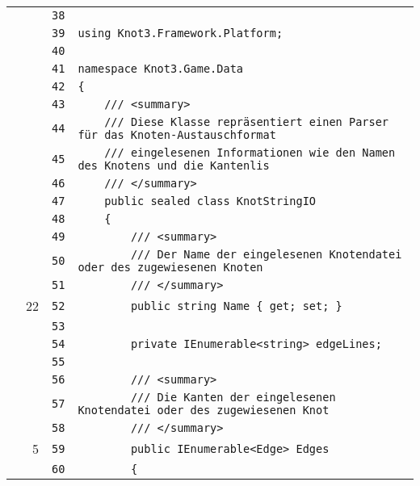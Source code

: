 \documentclass[a4paper,10pt]{article}
\begin{document}
\begin{longtable}[l]{lrrl}
\cellcolor{gray} &  & \verb~38~ & \verb~~\\
\cellcolor{gray} &  & \verb~39~ & \verb~using Knot3.Framework.Platform;~\\
\cellcolor{gray} &  & \verb~40~ & \verb~~\\
\cellcolor{gray} &  & \verb~41~ & \verb~namespace Knot3.Game.Data~\\
\cellcolor{gray} &  & \verb~42~ & \verb~{~\\
\cellcolor{gray} &  & \verb~43~ & \verb~    /// <summary>~\\
\cellcolor{gray} &  & \verb~44~ & \verb~    /// Diese Klasse repräsentiert einen Parser für das Knoten-Austauschformat~\\
\cellcolor{gray} &  & \verb~45~ & \verb~    /// eingelesenen Informationen wie den Namen des Knotens und die Kantenlis~\\
\cellcolor{gray} &  & \verb~46~ & \verb~    /// </summary>~\\
\cellcolor{gray} &  & \verb~47~ & \verb~    public sealed class KnotStringIO~\\
\cellcolor{gray} &  & \verb~48~ & \verb~    {~\\
\cellcolor{gray} &  & \verb~49~ & \verb~        /// <summary>~\\
\cellcolor{gray} &  & \verb~50~ & \verb~        /// Der Name der eingelesenen Knotendatei oder des zugewiesenen Knoten~\\
\cellcolor{gray} &  & \verb~51~ & \verb~        /// </summary>~\\
\cellcolor{green} & 22 & \verb~52~ & \verb~        public string Name { get; set; }~\\
\cellcolor{gray} &  & \verb~53~ & \verb~~\\
\cellcolor{gray} &  & \verb~54~ & \verb~        private IEnumerable<string> edgeLines;~\\
\cellcolor{gray} &  & \verb~55~ & \verb~~\\
\cellcolor{gray} &  & \verb~56~ & \verb~        /// <summary>~\\
\cellcolor{gray} &  & \verb~57~ & \verb~        /// Die Kanten der eingelesenen Knotendatei oder des zugewiesenen Knot~\\
\cellcolor{gray} &  & \verb~58~ & \verb~        /// </summary>~\\
\cellcolor{green} & 5 & \verb~59~ & \verb~        public IEnumerable<Edge> Edges~\\
\cellcolor{gray} &  & \verb~60~ & \verb~        {~\\

\end{longtable}
\end{document}
